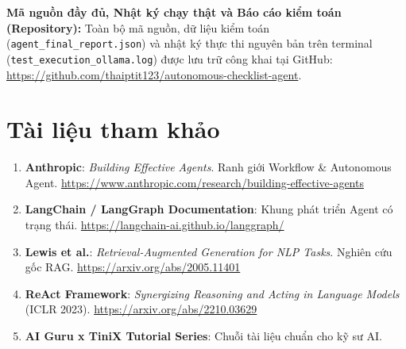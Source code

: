 \documentclass[]{article}
\providecommand{\tightlist}{%
  \setlength{\itemsep}{0pt}\setlength{\parskip}{0pt}}
\begin{document}
\textbf{Mã nguồn đầy đủ, Nhật ký chạy thật và Báo cáo kiểm toán (Repository):} Toàn bộ mã nguồn, dữ liệu kiểm toán (\texttt{agent\_final\_report.json}) và nhật ký thực thi nguyên bản trên terminal (\texttt{test\_execution\_ollama.log}) được lưu trữ công khai tại GitHub: \url{https://github.com/thaiptit123/autonomous-checklist-agent}.

\section{Tài liệu tham khảo}\label{tai-lieu-tham-khao}

\begin{enumerate}
    \tightlist
    \def\labelenumi{[\arabic{enumi}]}
    \item \textbf{Anthropic}: \textit{Building Effective Agents}. Ranh giới Workflow \& Autonomous Agent. \url{https://www.anthropic.com/research/building-effective-agents}
    \item \textbf{LangChain / LangGraph Documentation}: Khung phát triển Agent có trạng thái. \url{https://langchain-ai.github.io/langgraph/}
    \item \textbf{Lewis et al.}: \textit{Retrieval-Augmented Generation for NLP Tasks}. Nghiên cứu gốc RAG. \url{https://arxiv.org/abs/2005.11401}
    \item \textbf{ReAct Framework}: \textit{Synergizing Reasoning and Acting in Language Models} (ICLR 2023). \url{https://arxiv.org/abs/2210.03629}
    \item \textbf{AI Guru x TiniX Tutorial Series}: Chuỗi tài liệu chuẩn cho kỹ sư AI.
\end{enumerate}
\end{document}
